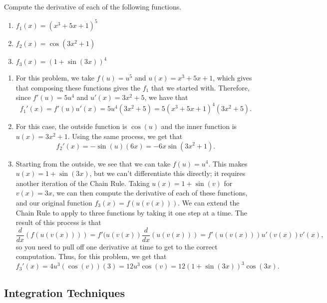 \begin{example}
Compute the derivative of each of the following functions.
\begin{enumerate}
\item $f_1(x) = (x^3 + 5x + 1)^5$
\item $f_2(x) = \cos(3x^2 + 1)$
\item $f_3(x) = (1 + \sin(3x))^4$
\end{enumerate}
\end{example}
\begin{exampleSol}
\begin{enumerate}
\item For this problem, we take $f(u) = u^5$ and $u(x) = x^3 + 5x + 1$, which gives that composing these functions gives the $f_1$ that we started with. Therefore, since $f'(u) = 5u^4$ and $u'(x) = 3x^2 + 5$, we have that
\[ f_1'(x) = f'(u)u'(x) = 5u^4(3x^2 + 5) = 5(x^3 + 5x + 1)^4(3x^2 + 5). \]
\item For this case, the outside function is $\cos(u)$ and the inner function is $u(x) = 3x^2 + 1$. Using the same process, we get that
\[ f_2'(x) = -\sin(u)(6x) = -6x\sin(3x^2 + 1).\]
\item Starting from the outside, we see that we can take $f(u) = u^4$. This makes $u(x) = 1 + \sin(3x)$, but we can't differentiate this directly; it requires another iteration of the Chain Rule. Taking $u(x) = 1 + \sin(v)$ for $v(x) = 3x$, we can then compute the derivative of each of these functions, and our original function $f_3(x) = f(u(v(x)))$. We can extend the Chain Rule to apply to three functions by taking it one step at a time. The result of this process is that
\[ \frac{d}{dx}(f(u(v(x)))) = f'(u(v(x))\frac{d}{dx}(u(v(x))) = f'(u(v(x)))u'(v(x))v'(x),\] so you need to pull off one derivative at time to get to the correct computation. Thus, for this problem, we get that
\[ f_3'(x) = 4u^3(\cos(v))(3) = 12u^3\cos(v) = 12(1 + \sin(3x))^3\cos(3x).\]
\end{enumerate}
\end{exampleSol}


\subsection{Integration Techniques}

